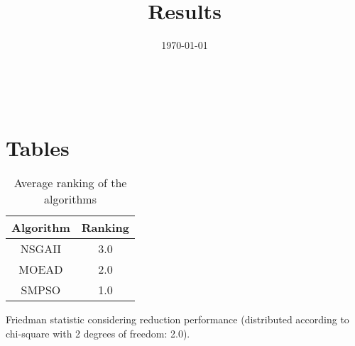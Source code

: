 \documentclass{article}
\title{Results}
\author{}
\date{\today}
\begin{document}
\oddsidemargin 0in \topmargin 0in\maketitle
\
\section{Tables}
\begin{table}[!htp]
\centering
\caption{Average ranking of the algorithms}
\begin{tabular}{c|c}
Algorithm&Ranking\\
\hline
NSGAII&3.0\\
MOEAD&2.0\\
SMPSO&1.0\\
\end{tabular}
\end{table}


Friedman statistic considering reduction performance (distributed according to chi-square with 2 degrees of freedom: 2.0).
\end{document}
